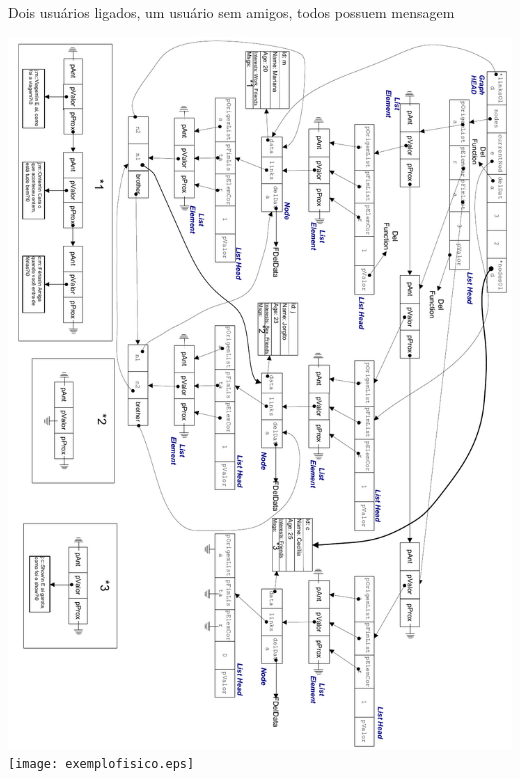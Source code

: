 \documentclass[a4paper,8pt]{article}
\begin{document}
Dois usuários ligados, um usuário sem amigos, todos possuem mensagem


\ifpdf
\includegraphics[width=\linewidth]{exemplofisico.pdf}
\else
\texttt{[image: exemplofisico.eps]}
\fi
\end{document}

